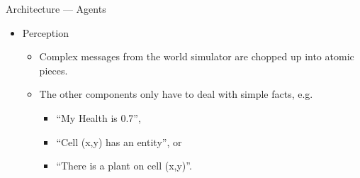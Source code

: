 \documentclass{beamer}
\def\tikzoverlay{%
   \tikz[baseline,overlay]\node[every overlay node]
}%
\begin{document}
   \begin{frame}{Architecture --- Agents}
      \begin{itemize}
         \item Perception
            \begin{itemize}
               \item Complex messages from the world simulator are chopped up into atomic pieces.
               \item The other components only have to deal with simple facts, e.g.
                  \begin{itemize}
                     \item ``My Health is 0.7'',
                     \item ``Cell (x,y) has an entity'', or
                     \item ``There is a plant on cell (x,y)''.
                  \end{itemize}
            \end{itemize}
      \end{itemize}
      
   \end{frame}
   
\end{document}
